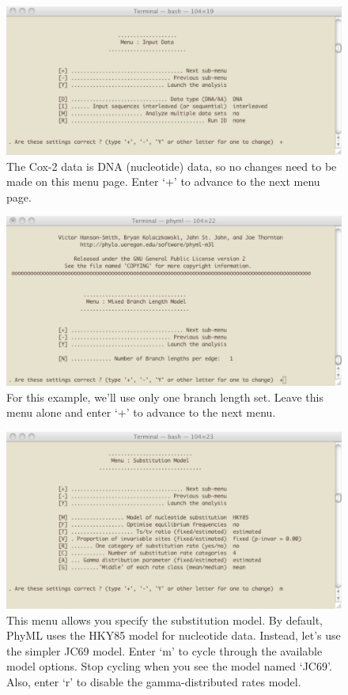 \documentclass[11pt]{article}
\begin{document}
\begin{figure}[p]
\centering
\includegraphics[width=5.5 in]{GRAPHICS/a2.pdf}
\caption{The Cox-2 data is DNA (nucleotide) data, so no changes need to be made on this menu page.  Enter `+' to advance to the next menu page.}
\end{figure}
\clearpage

\begin{figure}[p]
\centering
\includegraphics[width=5.5 in]{GRAPHICS/b1.pdf}
\caption{For this example, we'll use only one branch length set.  Leave this menu alone and enter `+' to advance to the next menu.}
\end{figure}
\clearpage

\begin{figure}[ph]
\centering
\includegraphics[width=5.5 in]{GRAPHICS/a8.pdf}
\caption{This menu allows you specify the substitution model.  By default, PhyML uses the HKY85 model for nucleotide data.  Instead, let's use the simpler JC69 model.  Enter `m' to cycle through the available model options.  Stop cycling when you see the model named `JC69'.  Also, enter `r' to disable the gamma-distributed rates model.}
\end{figure}
\clearpage
\end{document}
